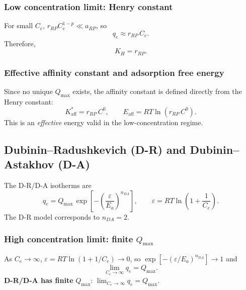 \documentclass[journal=aamick,manuscript=article]{achemso}
\begin{document}
\subsubsection{Low concentration limit: Henry constant}

For small $C_e$, $r_{RP}C_e^{1-p} \ll a_{RP}$, so
\begin{equation}
	q_e \approx r_{RP}\, C_e.
\end{equation}
Therefore,
\begin{equation}
	\boxed{K_H = r_{RP}.}
\end{equation}

\subsubsection{Effective affinity constant and adsorption free energy}

Since no unique $Q_{\max}$ exists, the affinity constant is defined directly from the Henry constant:
\begin{equation}
	\boxed{
		K_{\mathrm{aff}}^{\ast} = r_{RP}\, C^0,
		\qquad
		E_{\mathrm{aff}} = RT\ln(r_{RP}\, C^0).
	}
\end{equation}
This is an \emph{effective} energy valid in the low-concentration regime.

\subsection{Dubinin--Radushkevich (D-R) and Dubinin--Astakhov (D-A)}
\label{sec:si_dr_da}

The D-R/D-A isotherms are
\begin{equation}
	q_e = Q_{\max}\,\exp\!\left[-\left(\frac{\varepsilon}{E_a}\right)^{n_{DA}}\right],
	\qquad
	\varepsilon = RT\ln\!\left(1 + \frac{1}{C_e}\right).
	\label{eq:si_dr_da}
\end{equation}
The D-R model corresponds to $n_{DA} = 2$.

\subsubsection{High concentration limit: finite $Q_{\max}$}

As $C_e \to \infty$, $\varepsilon = RT\ln(1+1/C_e) \to 0$, so
$\exp[-(\varepsilon/E_a)^{n_{DA}}] \to 1$ and
\begin{equation}
	\lim_{C_e \to \infty} q_e = Q_{\max}.
\end{equation}
\textbf{D-R/D-A has finite }$Q_{\max}$:\quad
$\displaystyle \lim_{C_e \to \infty} q_e = Q_{\max}$.
\end{document}
